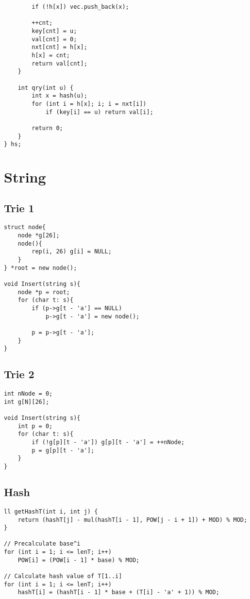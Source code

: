 \documentclass[11pt,a4paper]{article}
\begin{document}
\begin{multicols*}{2}
\begin{lstlisting}
        if (!h[x]) vec.push_back(x);
 
        ++cnt;
        key[cnt] = u;
        val[cnt] = 0;
        nxt[cnt] = h[x];
        h[x] = cnt;
        return val[cnt];
    }
    
    int qry(int u) {
        int x = hash(u);
        for (int i = h[x]; i; i = nxt[i])
            if (key[i] == u) return val[i];
 
        return 0;
    }
} hs;
\end{lstlisting}

\section {String}
\subsection{Trie 1}
\begin{lstlisting}
struct node{
	node *g[26];
	node(){
		rep(i, 26) g[i] = NULL;
	}
} *root = new node();

void Insert(string s){
	node *p = root;
	for (char t: s){
		if (p->g[t - 'a'] == NULL)
			p->g[t - 'a'] = new node();
		
		p = p->g[t - 'a'];	
	}
}
\end{lstlisting}

\subsection{Trie 2}
\begin{lstlisting}
int nNode = 0;
int g[N][26];

void Insert(string s){
    int p = 0;
    for (char t: s){
        if (!g[p][t - 'a']) g[p][t - 'a'] = ++nNode;
        p = g[p][t - 'a'];
    }
}
\end{lstlisting}

\subsection{Hash}
\begin{lstlisting}
ll getHashT(int i, int j) {
    return (hashT[j] - mul(hashT[i - 1], POW[j - i + 1]) + MOD) % MOD;
}

// Precalculate base^i
for (int i = 1; i <= lenT; i++)
    POW[i] = (POW[i - 1] * base) % MOD;

// Calculate hash value of T[1..i]
for (int i = 1; i <= lenT; i++)
    hashT[i] = (hashT[i - 1] * base + (T[i] - 'a' + 1)) % MOD;
\end{lstlisting}


\end{multicols*}
\end{document}
